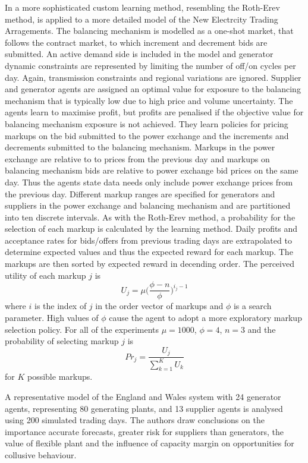 In \cite{bower:2001b} a more sophisticated custom learning method, resembling
the Roth-Erev method, is applied to a more detailed model of the New Electrcity
Trading Arragements.  The balancing mechanism is modelled as a one-shot
market, that follows the contract market, to which increment and decrement
bids are submitted.  An active demand side is included in the model and
generator dynamic constraints are represented by limiting the number of off/on
cycles per day.  Again, transmission constraints and regional variations are
ignored.  Supplier and generator agents are assigned an optimal value for
exposure to the balancing mechanism that is typically low due to high price and
volume uncertainty.  The agents learn to maximise profit, but profits are
penalised if the objective value for balancing mechanism exposure is not
achieved.  They learn policies for pricing markups on the bid submitted
to the power exchange and the increments and decrements submitted to the
balancing mechanism.  Markups in the power exchange are relative to to prices
from the previous day and markups on balancing mechanism bids are relative to
power exchange bid prices on the same day.  Thus the agents state data needs
only include power exchange prices from the previous day.  Different markup
ranges are specified for generators and suppliers in the power exchange and
balancing mechanism and are partitioned into ten discrete intervals.  As with
the Roth-Erev method, a probability for the selection of each markup is
calculated by the learning method.  Daily profits and acceptance rates for
bids/offers from previous trading days are extrapolated to determine expected
values and thus the expected reward for each markup.  The markups are then
sorted by expected reward in decending order.  The perceived utility of each
markup $j$ is
\begin{equation}
U_j = \mu \biggl(\frac{\phi - n}{\phi}\biggr)^{i_j-1}
\end{equation}
where $i$ is the index of $j$ in the order vector of markups and $\phi$ is a
search parameter.  High values of $\phi$ cause the agent to adopt a more
exploratory markup selection policy.  For all of the experiments $\mu = 1000$,
$\phi = 4$, $n = 3$ and the probability of selecting markup $j$ is
\begin{equation}
Pr_j = \frac{U_j}{\sum_{k=1}^K U_k}
\end{equation}
for $K$ possible markups.

A representative model of the England and Wales system with 24 generator
agents, representing 80 generating plants, and 13 supplier agents is analysed
using 200 simulated trading days.  The authors draw conclusions on the
importance accurate forecasts, greater risk for suppliers than generators, the
value of flexible plant and the influence of capacity margin on opportunities
for collusive behaviour.

